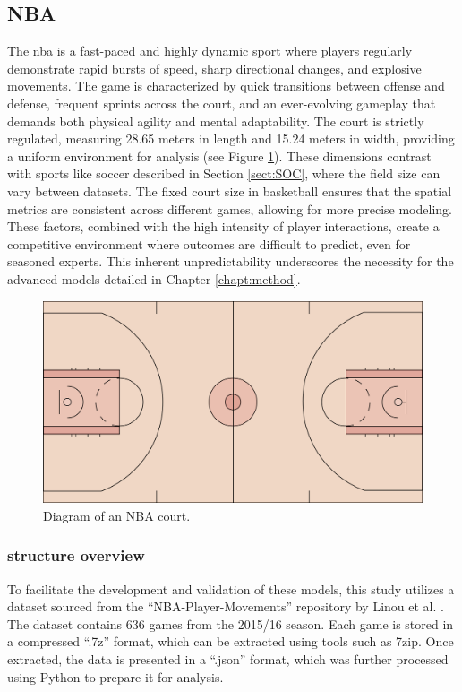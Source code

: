 \subsection{NBA}
\label{sect:NBA}
The \gls{nba} is a fast-paced and highly dynamic sport where players regularly demonstrate rapid bursts of speed, sharp directional changes, and explosive movements. The game is characterized by quick transitions between offense and defense, frequent sprints across the court, and an ever-evolving gameplay that demands both physical agility and mental adaptability. The court is strictly regulated, measuring 28.65 meters in length and 15.24 meters in width, providing a uniform environment for analysis (see Figure \ref{fig:nba_court}). These dimensions contrast with sports like soccer described in Section \ref{sect:SOC}, where the field size can vary between datasets. The fixed court size in basketball ensures that the spatial metrics are consistent across different games, allowing for more precise modeling. These factors, combined with the high intensity of player interactions, create a competitive environment where outcomes are difficult to predict, even for seasoned experts. This inherent unpredictability underscores the necessity for the advanced models detailed in Chapter \ref{chapt:method}.

\begin{figure}[t]
    \centering
    \includegraphics[width=\textwidth]{contents/nba_court.png}
    \caption{Diagram of an NBA court.}
    \label{fig:nba_court}
\end{figure}

\subsubsection{structure overview}
\label{sect:original_nba}

To facilitate the development and validation of these models, this study utilizes a dataset sourced from the ``NBA-Player-Movements'' repository by Linou et al. \cite{linouk}. The dataset contains 636 games from the 2015/16 season. Each game is stored in a compressed ``.7z'' format, which can be extracted using tools such as 7zip. Once extracted, the data is presented in a ``.json'' format, which was further processed using Python to prepare it for analysis.

